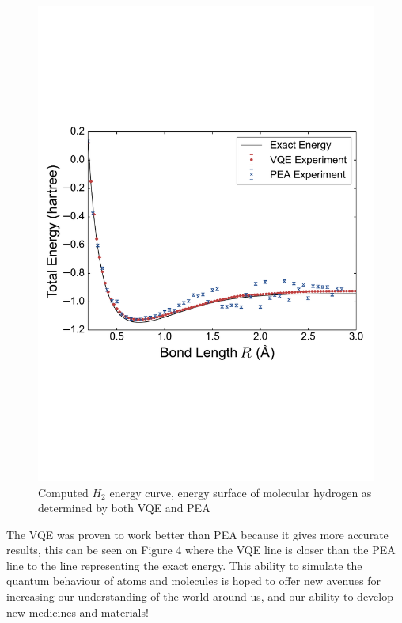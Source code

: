 \documentclass[14pt,landscape,color=UCLdarkred,margin=3cm]{uclposter}
\begin{document}
\begin{multicols}{3}
\begin{figure}[H]
  \begin{center}
  \includegraphics[scale=1.5]{result.pdf}
  \caption{Computed $H_2$ energy curve, energy surface of molecular hydrogen as determined by both VQE and PEA}
  \end{center}
    
 

   
\end{figure}

The VQE was proven to work better than PEA because it gives more accurate results, this can be seen on Figure 4 where the VQE line is closer than the PEA line to the line representing the exact energy. This ability to simulate the quantum behaviour of atoms and molecules is hoped to offer new avenues for increasing our understanding of the world around us, and our ability to develop new medicines and materials!

\end{multicols}
	
\end{document}
